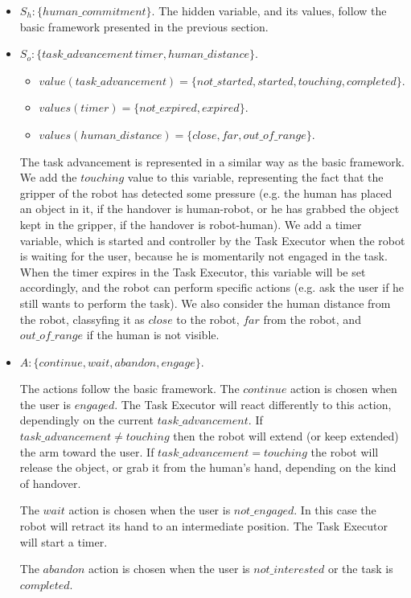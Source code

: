 \begin{itemize}
	\item $S_h:\{human\_commitment\}$.
		The hidden variable, and its values, follow the basic framework presented in the previous section.
	\item $S_o:\{task\_advancement\, timer, human\_distance\}$.
		\begin{itemize}
			\item $value(task\_advancement)=\{not\_started,started,touching,completed\}$.
			\item $values(timer)=\{not\_expired,expired\}$.
			\item $values(human\_distance)=\{close, far, out\_of\_range\}$.
		\end{itemize}

		The task advancement is represented in a similar way as the basic framework. We add the $touching$ value to this variable, representing the fact that the gripper of the robot has detected some pressure (e.g. the human has placed an object in it, if the handover is human-robot, or he has grabbed the object kept in the gripper, if the handover is robot-human).
		 We add a timer variable, which is started and controller by the Task Executor when the robot is waiting for the user, because he is momentarily not engaged in the task. When the timer expires in the Task Executor, this variable will be set accordingly, and the robot can perform specific actions (e.g. ask the user if he still wants to perform the task).
		 We also consider the human distance from the robot, classyfing it as $close$ to the robot, $far$ from the robot, and $out\_of\_range$ if the human is not visible. 
	\item $A:\{continue,wait,abandon,engage\}$.

		The actions follow the basic framework. The $continue$ action is chosen when the user is $engaged$. The Task Executor will react differently to this action, dependingly on the current $task\_advancement$. If $task\_advancement \neq touching$ then the robot will extend (or keep extended) the arm toward the user. If $task\_advancement=touching$ the robot will release the object, or grab it from the human's hand, depending on the kind of handover.

		The $wait$ action is chosen when the user is $not\_engaged$. In this case the robot will retract its hand to an intermediate position. The Task Executor will start a timer.

		The $abandon$ action is chosen when the user is $not\_interested$ or the task is $completed$.


\end{itemize}
